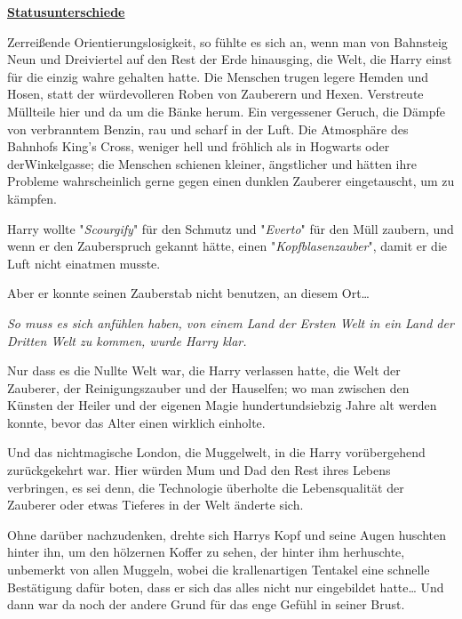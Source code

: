 

\hypertarget{statusunterschiede}{%

\textbf{\uline{Statusunterschiede}}

Zerreißende Orientierungslosigkeit, so fühlte es sich an, wenn man von Bahnsteig Neun und Dreiviertel auf den Rest der Erde hinausging, die Welt, die Harry einst für die einzig wahre gehalten hatte. Die Menschen trugen legere Hemden und Hosen, statt der würdevolleren Roben von Zauberern und Hexen. Verstreute Müllteile hier und da um die Bänke herum. Ein vergessener Geruch, die Dämpfe von verbranntem Benzin, rau und scharf in der Luft. Die Atmosphäre des Bahnhofs King's Cross, weniger hell und fröhlich als in Hogwarts oder derWinkelgasse; die Menschen schienen kleiner, ängstlicher und hätten ihre Probleme wahrscheinlich gerne gegen einen dunklen Zauberer eingetauscht, um zu kämpfen.

Harry wollte "\emph{Scourgify}" für den Schmutz und "\emph{Everto}" für den Müll zaubern, und wenn er den Zauberspruch gekannt hätte, einen "\emph{Kopfblasenzauber}", damit er die Luft nicht einatmen musste.

Aber er konnte seinen Zauberstab nicht benutzen, an diesem Ort…

\emph{So muss es sich anfühlen haben, von einem Land der Ersten Welt in ein Land der Dritten Welt zu kommen, wurde Harry klar.}

Nur dass es die Nullte Welt war, die Harry verlassen hatte, die Welt der Zauberer, der Reinigungszauber und der Hauselfen; wo man zwischen den Künsten der Heiler und der eigenen Magie hundertundsiebzig Jahre alt werden konnte, bevor das Alter einen wirklich einholte.

Und das nichtmagische London, die Muggelwelt, in die Harry vorübergehend zurückgekehrt war. Hier würden Mum und Dad den Rest ihres Lebens verbringen, es sei denn, die Technologie überholte die Lebensqualität der Zauberer oder etwas Tieferes in der Welt änderte sich.

Ohne darüber nachzudenken, drehte sich Harrys Kopf und seine Augen huschten hinter ihn, um den hölzernen Koffer zu sehen, der hinter ihm herhuschte, unbemerkt von allen Muggeln, wobei die krallenartigen Tentakel eine schnelle Bestätigung dafür boten, dass er sich das alles nicht nur eingebildet hatte… Und dann war da noch der andere Grund für das enge Gefühl in seiner Brust.

}
